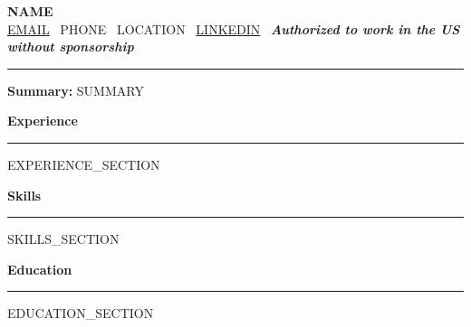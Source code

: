 \documentclass[9pt,letterpaper]{extarticle}
\begin{document}
\vspace*{-10pt}

\noindent
{\LARGE \textbf{{{NAME}}}}\\[2pt]
\footnotesize
\href{mailto:{{EMAIL}}}{{{EMAIL}}} \textbullet\ {{PHONE}} \textbullet\ {{LOCATION}} \textbullet\ \href{https://{{LINKEDIN}}}{{{LINKEDIN}}} \textbullet\ \textit{\textbf{Authorized to work in the US without sponsorship}} \\[-2pt]
\hrule
\vspace{4pt}

\noindent
\textbf{Summary:} {{SUMMARY}}

\vspace{5pt}
\noindent
\textbf{\large Experience}
\vspace{1pt}
\hrule
\vspace{3pt}

{{EXPERIENCE_SECTION}}

\vspace{3pt}
\noindent
\textbf{\large Skills}
\vspace{1pt}
\hrule
\vspace{3pt}

\begin{itemize}[itemsep=0.85pt]

{{SKILLS_SECTION}}

\end{itemize}

\vspace{3pt}
\noindent
\textbf{\large Education}
\vspace{1pt}
\hrule
\vspace{3pt}

\begin{itemize}[itemsep=2pt]

{{EDUCATION_SECTION}}

\end{itemize}
\end{document}
